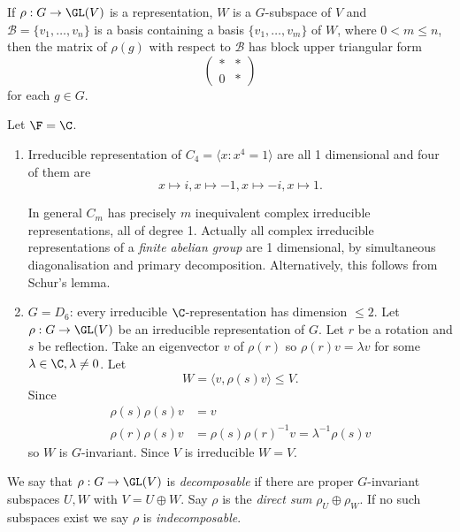 \documentclass[a4paper]{article}
\begin{document}
\begin{lemma}
  If \(\rho: G \to \GL(V)\) is a representation, \(W\) is a \(G\)-subspace of \(V\) and \(\mathcal B = \{v_1, \dots, v_n\}\) is a basis containing a basis \(\{v_1, \dots, v_m\}\) of \(W\), where \(0 < m \leq n\), then the matrix of \(\rho(g)\) with respect to \(\mathcal B\) has block upper triangular form
  \[
    \begin{pmatrix}
      * & * \\
      0 & *
    \end{pmatrix}
  \]
  for each \(g \in G\).
\end{lemma}

\begin{eg}
  Let \(\F = \C\).
  \begin{enumerate}
  \item Irreducible representation of \(C_4 = \langle x: x^4 = 1\rangle\) are all 1 dimensional and four of them are
    \[
      x \mapsto i, x \mapsto -1, x \mapsto -i, x \mapsto 1.
    \]

    In general \(C_m\) has precisely \(m\) inequivalent complex irreducible representations, all of degree 1. Actually all complex irreducible representations of a \emph{finite abelian group} are 1 dimensional, by simultaneous diagonalisation and primary decomposition. Alternatively, this follows from Schur's lemma.
  \item \(G = D_6\): every irreducible \(\C\)-representation has dimension \(\leq 2\). Let \(\rho: G \to \GL(V)\) be an irreducible representation of \(G\). Let \(r\) be a rotation and \(s\) be reflection. Take an eigenvector \(v\) of \(\rho(r)\) so \(\rho(r)v = \lambda v\) for some \(\lambda \in \C, \lambda \neq 0\). Let
    \[
      W = \langle v, \rho(s) v \rangle \leq V.
    \]
    Since
    \begin{align*}
      \rho(s)\rho(s) v &= v \\
      \rho(r)\rho(s) v &= \rho(s)\rho(r)^{-1}v = \lambda^{-1}\rho(s)v
    \end{align*}
    so \(W\) is \(G\)-invariant. Since \(V\) is irreducible \(W = V\).
  \end{enumerate}
\end{eg}

\begin{definition}
  We say that \(\rho: G \to \GL(V)\) is \emph{decomposable} if there are proper \(G\)-invariant subspaces \(U, W\) with \(V = U \oplus W\). Say \(\rho\) is the \emph{direct sum} \(\rho_U \oplus \rho_W\). If no such subspaces exist we say \(\rho\) is \emph{indecomposable}.
\end{definition}
\end{document}
